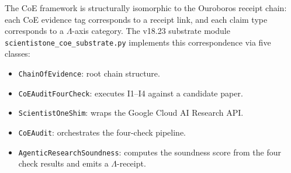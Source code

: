 The CoE framework is structurally isomorphic to the Ouroboros receipt chain:
each CoE evidence tag corresponds to a receipt link, and each claim type
corresponds to a \(\Lambda\)-axis category.  The v18.23 substrate module
\texttt{scientistone\_coe\_substrate.py} implements this correspondence via
five classes:

\begin{itemize}
  \item \texttt{ChainOfEvidence}: root chain structure.
  \item \texttt{CoEAuditFourCheck}: executes I1--I4 against a candidate paper.
  \item \texttt{ScientistOneShim}: wraps the Google Cloud AI Research API.
  \item \texttt{CoEAudit}: orchestrates the four-check pipeline.
  \item \texttt{AgenticResearchSoundness}: computes the soundness score
    from the four check results and emits a \(\Lambda\)-receipt.
\end{itemize}

